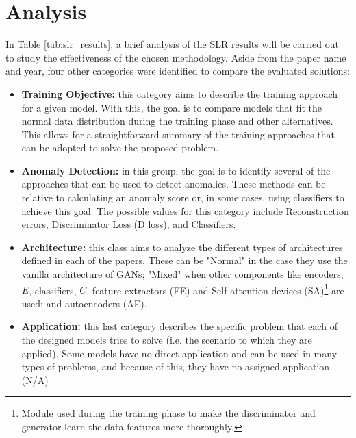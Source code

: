 \section{Analysis}\label{sec:res_analysis}
In Table \ref{tab:slr_results}, a brief analysis of the SLR results will be carried out to study the effectiveness of the chosen methodology. Aside from the paper name and year, four other categories were identified to compare the evaluated solutions:

\begin{itemize}
    \item \textbf{Training Objective:} this category aims to describe the training approach for a given model. With this, the goal is to compare models that fit the normal data distribution during the training phase and other alternatives. This allows for a straightforward summary of the training approaches that can be adopted to solve the proposed problem.

    \item \textbf{Anomaly Detection:} in this group, the goal is to identify several of the approaches that can be used to detect anomalies. These methods can be relative to calculating an anomaly score or, in some cases, using classifiers to achieve this goal. The possible values for this category include Reconstruction errors, Discriminator Loss (D loss), and Classifiers.

    \item \textbf{Architecture:} this class aims to analyze the different types of architectures defined in each of the papers. These can be "Normal" in the case they use the vanilla architecture of GANs;  "Mixed" when other components like encoders, $E$, classifiers, $C$, feature extractors (FE) and Self-attention devices (SA)\footnote{Module used during the training phase to make the discriminator and generator learn the data features more thoroughly.} are used; and autoencoders (AE).

    \item \textbf{Application:} this last category describes the specific problem that each of the designed models tries to solve (i.e. the scenario to which they are applied). Some models have no direct application and can be used in many types of problems, and because of this, they have no assigned application (N/A)
\end{itemize}



